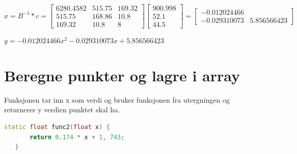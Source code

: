 \documentclass[a4paper,norsk]{article}
\begin{document}
\begin{equation*}
x = B^{-1} * c = \begin{bmatrix}  6280.4582 & 515.75 & 169.32 \\ 515.75 & 168.86 & 10.8 \\ 169.32 & 10.8 & 8  \end{bmatrix}\begin{bmatrix} 900.998 \\52.1 \\44.5 \end{bmatrix}
= \begin{bmatrix}-0.012024466 \\ -0.029310073 & 5.856566423 \end{bmatrix}
\end{equation*}

$y =-0.012024466x^{2}-0.029310073x+5.856566423$
\section{Beregne punkter og lagre i array}
Funksjonen tar inn x som verdi og bruker funksjonen fra utergningen og returnerer y verdien punktet skal ha.
\begin{lstlisting}[language=C++, caption={trianglesurface.h}]
static float func2(float x) {
       return 0.174 * x + 1, 743;
   }
\end{lstlisting}
\end{document}

